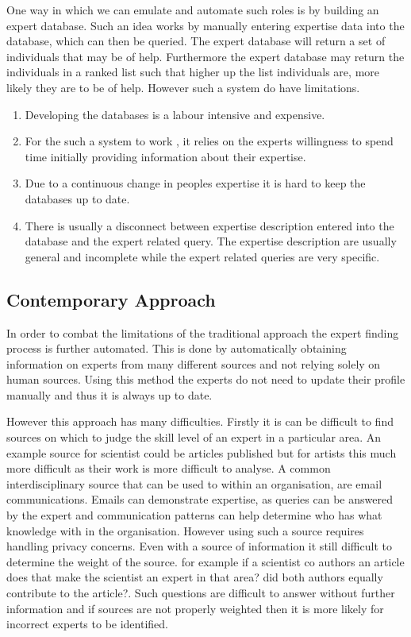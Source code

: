 \documentclass[a4paper,oneside,11pt]{report}
\begin{document}
One way in which we can emulate and automate such roles is by building an expert database. Such an idea works by manually entering expertise data into the database, which can then be queried. The expert database will return a set of individuals that may be of help. Furthermore the expert database  may return the individuals in a ranked list such that higher up the list individuals are, more likely they are to be of help. However such a system do have limitations\autocite{kobsaseid2003}.
\begin{enumerate}
	\item Developing the databases is a labour intensive and expensive.
	\item For the such a system to work , it relies on the experts willingness to spend time 		  			  initially providing information about their expertise.
	\item Due to a continuous change in peoples expertise it is hard to keep the databases up to 				  date.
	\item There is usually a disconnect between expertise description entered into the database and 	          the expert related query. The expertise description are usually general and incomplete                                                                            		  while the expert related queries are very specific. 
\end{enumerate}

\subsection{Contemporary Approach}
In order to combat the limitations of the traditional approach the expert finding process is further automated. This is done by automatically obtaining information on experts from many different sources and not relying solely on human sources\autocite{kobsaseid2003}. Using this method the experts do not need to update their profile manually and thus it is always up to date. 

However this approach has many difficulties. Firstly it is can be difficult to find sources on which to judge the skill level of an expert in a particular area. An example source for scientist could be articles published but for artists this much more difficult as their work is more difficult to analyse. A common interdisciplinary source that can be used to within an organisation, are email communications. Emails can demonstrate expertise, as queries can be answered by the expert and communication patterns can help determine who has what knowledge with in the organisation\autocite{campbell2003}. However using such a source requires handling privacy concerns. 
Even with a source of information it still difficult to determine the weight of the source. for example if a scientist co authors an article does that make the scientist an expert in that area? did both authors equally contribute to the article?. Such questions are difficult to answer without further information and if sources are not properly weighted then it is more likely for incorrect experts to be identified.
\end{document}
